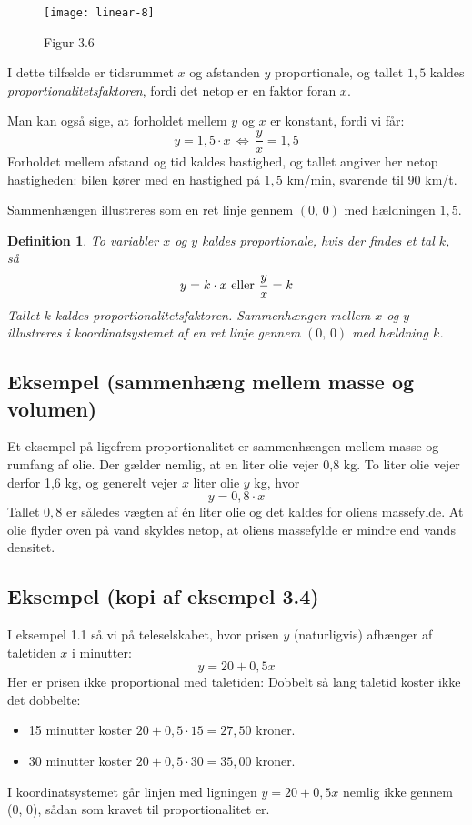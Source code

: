 \documentclass[12pt,oneside,a4paper]{article}
\newtheorem{mydef}[thm]{Definition}
\begin{document}
\begin{figure}[ht]
    \centering
    \texttt{[image: linear-8]}
    \caption{Figur 3.6}
    \label{fig36}
\end{figure}

I dette tilfælde er tidsrummet $x$ og afstanden $y$ proportionale, og tallet
$1,5$ kaldes {\em proportionalitetsfaktoren}, fordi det netop er en faktor foran $x$.

Man kan også sige, at forholdet mellem $y$ og $x$ er konstant, fordi vi får:
$$
y = 1,5\cdot x \, \Leftrightarrow \, \frac{y}{x} = 1,5
$$
Forholdet mellem afstand og tid kaldes hastighed, og tallet angiver her netop
hastigheden: bilen kører med en hastighed på $1,5$ km/min, svarende til $90$
km/t.

Sammenhængen illustreres som en ret linje gennem $(0,\,0)$ med hældningen $1,5$.

\begin{mydef}
    To variabler $x$ og $y$ kaldes proportionale, hvis der findes et tal $k$, så
    $$
    y = k\cdot x \,\, {\rm eller} \,\, \frac{y}{x} = k
    $$
    Tallet $k$ kaldes proportionalitetsfaktoren. Sammenhængen mellem $x$ og $y$
    illustreres i koordinatsystemet af en ret linje gennem $(0,\,0)$ med 
    hældning $k$.
\end{mydef}

\subsection{Eksempel (sammenhæng mellem masse og volumen)}

Et eksempel på ligefrem proportionalitet er sammenhængen mellem masse og rumfang af olie.
Der gælder nemlig, at en liter olie vejer 0,8 kg. To liter olie vejer derfor 1,6 kg,
og generelt vejer $x$ liter olie $y$ kg, hvor
$$
y = 0,8 \cdot x
$$
Tallet $0,8$ er således vægten af én liter olie og det kaldes for oliens
massefylde.  At olie flyder oven på vand skyldes netop, at oliens massefylde er
mindre end vands densitet.

\subsection{Eksempel (kopi af eksempel 3.4)}
I eksempel 1.1 så vi på teleselskabet, hvor prisen $y$ (naturligvis) afhænger af
taletiden $x$ i minutter:
$$
y=20+0,5x
$$
Her er prisen ikke proportional med taletiden: Dobbelt så lang taletid koster ikke
det dobbelte:
\begin{itemize}
    \item 15 minutter koster $20+0,5\cdot 15 = 27,50$ kroner.
    \item 30 minutter koster $20+0,5\cdot 30 = 35,00$ kroner.
\end{itemize}
I koordinatsystemet går linjen med ligningen $y=20+0,5x$ nemlig ikke gennem (0, 0),
sådan som kravet til proportionalitet er.
\end{document}
